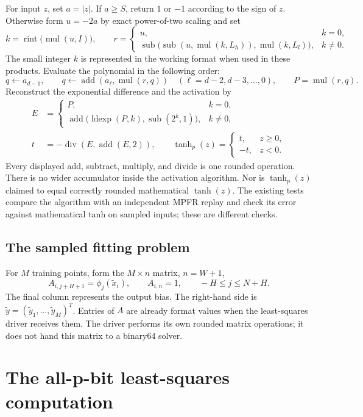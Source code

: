 \documentclass[11pt]{article}
\newcommand{\add}{\operatorname{add}}
\newcommand{\sub}{\operatorname{sub}}
\newcommand{\mul}{\operatorname{mul}}
\newcommand{\dv}{\operatorname{div}}
\newcommand{\rint}{\operatorname{rint}}
\newcommand{\ldexp}{\operatorname{ldexp}}
\newcommand{\tp}{\operatorname{tanh}_{p}}
\begin{document}
For input $z$, set $a=|z|$. If $a\ge S$, return $1$ or $-1$ according to
the sign of $z$. Otherwise form $u=-2a$ by exact power-of-two scaling and set
\[
 k=\rint\bigl(\mul(u,I)\bigr),\qquad
 r=\begin{cases}
 u,& k=0,\\
 \sub\bigl(\sub(u,\mul(k,L_h)),\mul(k,L_l)\bigr),& k\ne0.
 \end{cases}
\]
The small integer $k$ is represented in the working format when used in these
products. Evaluate the polynomial in the following order:
\[
 q\leftarrow a_{d-1},\qquad
 q\leftarrow\add(a_\ell,\mul(r,q))\quad
 (\ell=d-2,d-3,\ldots,0),\qquad P=\mul(r,q).
\]
Reconstruct the exponential difference and the activation by
\begin{align*}
 E&=\begin{cases}
 P,&k=0,\\
 \add\bigl(\ldexp(P,k),\sub(2^k,1)\bigr),&k\ne0,
 \end{cases}\\
 t&=-\dv(E,\add(E,2)),\qquad
 \tp(z)=\begin{cases}t,&z\ge0,\\-t,&z<0.\end{cases}
\end{align*}
Every displayed add, subtract, multiply, and divide is one rounded operation.
There is no wider accumulator inside the activation algorithm. Nor is
$\tp(z)$ claimed to equal correctly rounded mathematical $\tanh(z)$.
The existing tests compare the algorithm with an independent MPFR replay and
check its error against mathematical tanh on sampled inputs; these are
different checks.

\subsection{The sampled fitting problem}
For $M$ training points, form the $M\times n$ matrix, $n=W+1$,
\[
 A_{i,j+H+1}=\phi_j(\widetilde x_i),\qquad
 A_{i,n}=1,\qquad -H\le j\le N+H.
\]
The final column represents the output bias. The right-hand side is
$\widetilde y=(\widetilde y_1,\ldots,\widetilde y_M)^T$. Entries of $A$
are already format values when the least-squares driver receives them.
The driver performs its own rounded matrix operations; it does not hand this
matrix to a binary64 solver.

\section{The all-p-bit least-squares computation}
\end{document}
